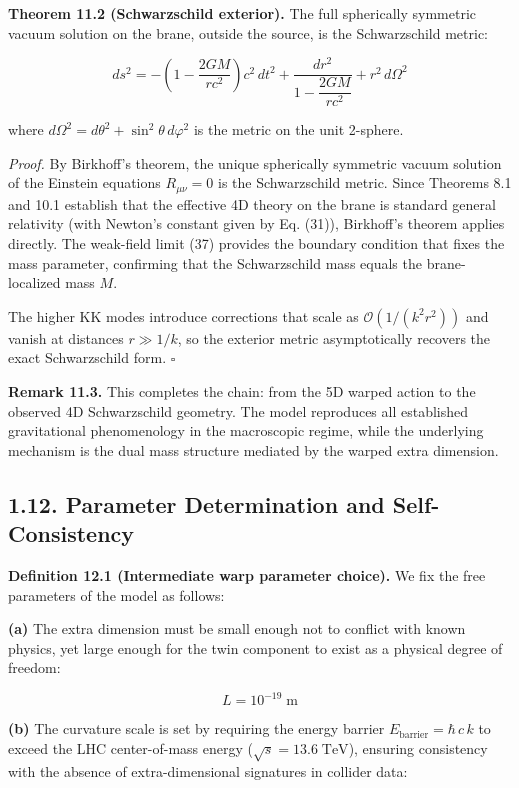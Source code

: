 \documentclass[
  11pt,
]{article}
\begin{document}
\textbf{Theorem 11.2 (Schwarzschild exterior).} The full spherically
symmetric vacuum solution on the brane, outside the source, is the
Schwarzschild metric:

\[ds^2 = -\left(1 - \frac{2GM}{rc^2}\right)c^2\,dt^2 + \frac{dr^2}{1 - \dfrac{2GM}{rc^2}} + r^2\,d\Omega^2 \tag{40}\]

where \(d\Omega^2 = d\theta^2 + \sin^2\theta\,d\varphi^2\) is the metric
on the unit 2-sphere.

\emph{Proof.} By Birkhoff's theorem, the unique spherically symmetric
vacuum solution of the Einstein equations \(R_{\mu\nu} = 0\) is the
Schwarzschild metric. Since Theorems 8.1 and 10.1 establish that the
effective 4D theory on the brane is standard general relativity (with
Newton's constant given by Eq. (31)), Birkhoff's theorem applies
directly. The weak-field limit (37) provides the boundary condition that
fixes the mass parameter, confirming that the Schwarzschild mass equals
the brane-localized mass \(M\).

The higher KK modes introduce corrections that scale as
\(\mathcal{O}(1/(k^2 r^2))\) and vanish at distances \(r \gg 1/k\), so
the exterior metric asymptotically recovers the exact Schwarzschild
form. \(\square\)

\textbf{Remark 11.3.} This completes the chain: from the 5D warped
action to the observed 4D Schwarzschild geometry. The model reproduces
all established gravitational phenomenology in the macroscopic regime,
while the underlying mechanism is the dual mass structure mediated by
the warped extra dimension.

\bigskip

\hypertarget{parameter-determination-and-self-consistency}{%
\subsection{1.12. Parameter Determination and
Self-Consistency}\label{parameter-determination-and-self-consistency}}

\textbf{Definition 12.1 (Intermediate warp parameter choice).} We fix
the free parameters of the model as follows:

\textbf{(a)} The extra dimension must be small enough not to conflict
with known physics, yet large enough for the twin component to exist as
a physical degree of freedom:

\[L = 10^{-19}\;\text{m} \tag{41}\]

\textbf{(b)} The curvature scale is set by requiring the energy barrier
\(E_{\text{barrier}} = \hbar\,c\,k\) to exceed the LHC center-of-mass
energy (\(\sqrt{s} = 13.6\;\text{TeV}\)), ensuring consistency with the
absence of extra-dimensional signatures in collider data:
\end{document}
